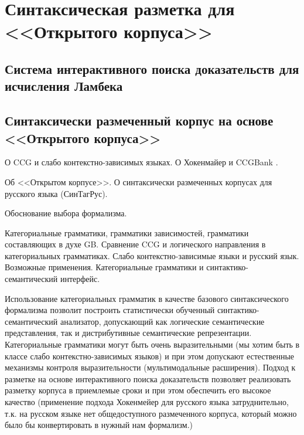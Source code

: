 \chapter{Синтаксическая разметка для <<Открытого корпуса>>}

\section{Система интерактивного поиска доказательств для исчисления Ламбека}

\section{Синтаксически размеченный корпус на основе <<Открытого корпуса>>}

О CCG и слабо контекстно-зависимых языках. О Хокенмайер и CCGBank \parencite{capelletti2009parsing}.

Об <<Открытом корпусе>>. О синтаксически размеченных корпусах для русского языка (СинТагРус).

Обоснование выбора формализма.

Категориальные грамматики, грамматики зависимостей, грамматики составляющих в духе GB. 
Сравнение CCG и логического направления в категориальных грамматиках. 
Слабо контекстно-зависимые языки и русский язык.
Возможные применения. Категориальные грамматики и синтактико-семантический интерфейс. 

Использование категориальных грамматик в качестве базового синтаксического формализма позволит построить статистически обученный синтактико-семантический анализатор, допускающий как логические семантические представления, так и дистрибутивные семантические репрезентации. Категориальные грамматики могут быть очень выразительными (мы хотим быть в классе слабо контекстно-зависимых языков) и при этом допускают естественные механизмы контроля выразительности (мультимодальные расширения). Подход к разметке на основе интерактивного поиска доказательств позволяет реализовать разметку корпуса в приемлемые сроки и при этом обеспечить его высокое качество (применение подхода Хокенмейер для русского языка затруднительно, т.к. на русском языке нет общедоступного размеченного корпуса, который можно было бы конвертировать в нужный нам формализм.)